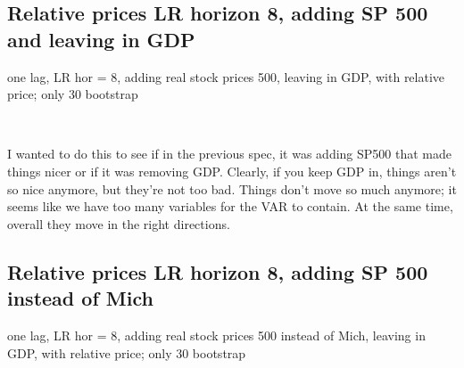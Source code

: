\documentclass{article}
\def \ourFigPath {../../}
\begin{document}
\newpage
	\subsection{Relative prices LR horizon 8, adding SP 500 and leaving in GDP}
	\noindent one lag, LR hor = 8, adding real stock prices 500, leaving in GDP, with relative price; only 30 bootstrap
	
	
	
	
	\begin{figure}[h!]
\centering
{} \hspace{.2in%
} 
\end{figure}

\

I wanted to do this to see if in the previous spec, it was adding SP500 that made things nicer or if it was removing GDP. Clearly, if you keep GDP in, things aren't so nice anymore, but they're not too bad. Things don't move so much anymore; it seems like we have too many variables for the VAR to contain. At the same time, overall they move in the right directions. 

\newpage
	\subsection{Relative prices LR horizon 8, adding SP 500 instead of Mich}
	\noindent one lag, LR hor = 8, adding real stock prices 500 instead of Mich, leaving in GDP, with relative price; only 30 bootstrap
	
	\
	
	
	
	
	\begin{figure}[h!]
\centering
{} \hspace{.2in%
} 
\end{figure}

\
\end{document}
